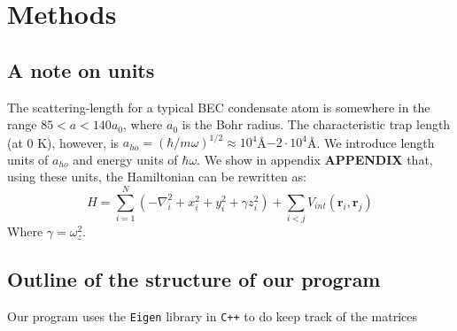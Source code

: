 \documentclass[a4paper, 10pt]{article}
\begin{document}
	
	
	
	\section{Methods}\label{Method_section}
	\subsection{A note on units}
	The scattering-length for a typical BEC condensate atom is somewhere in the range $85<a<140a_0$, where $a_0$ is the Bohr radius. The characteristic trap length (at 0 K), however, is $a_{ho}=(\hbar/m\omega)^{1/2}\approx 10^{4}$Å$-2\cdot 10^{4}$Å. We introduce length units of $a_{ho}$ and energy units of $\hbar \omega$. We show in appendix \textbf{APPENDIX} that, using these units, the Hamiltonian can be rewritten as:
	\begin{equation}\label{eq:Hamiltonian_dimensionless}
	H=\sum_{i=1}^N\left(-\nabla_i^2 + x_i^2+y_i^2+\gamma z_i^2\right)+\sum_{i<j}V_{int}(\boldsymbol{r}_i, \boldsymbol{r}_j)
	\end{equation}
	Where $\gamma=\omega_z^2$.
	
	
	
	\subsection{Outline of the structure of our program}
	Our program uses the \texttt{Eigen} library in \texttt{C++} to do keep track of the matrices  
\end{document}
